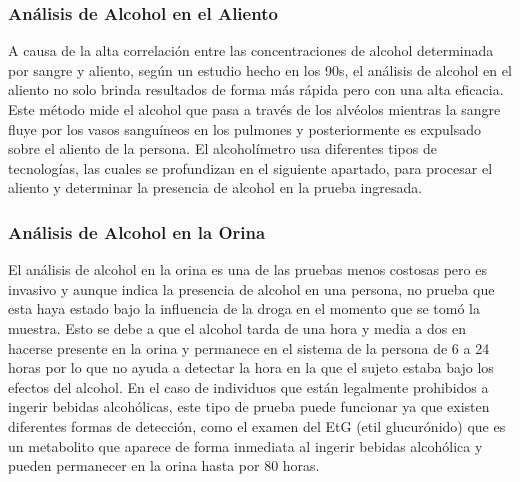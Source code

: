 \subsubsection{Análisis de Alcohol en el Aliento}
A causa de la alta correlación entre las concentraciones de alcohol determinada por sangre y aliento, según un estudio hecho en los 90s, el análisis de alcohol en el aliento no solo brinda resultados de forma más rápida pero con una alta eficacia. Este método mide el alcohol que pasa a través de los alvéolos mientras la sangre fluye por los vasos sanguíneos en los pulmones y posteriormente es expulsado sobre el aliento de la persona.  El alcoholímetro usa diferentes tipos de tecnologías, las cuales se profundizan en el siguiente apartado, para procesar el aliento y determinar la presencia de alcohol en la prueba ingresada.
\subsubsection{Análisis de Alcohol en la Orina}
El análisis de alcohol en la orina es una de las pruebas menos costosas pero es invasivo y aunque indica la presencia de alcohol en una persona, no prueba que esta haya estado bajo la influencia de la droga en el momento que se tomó la muestra. Esto se debe a que el alcohol tarda de una hora y media a dos en hacerse presente en la orina y permanece en el sistema de la persona de 6 a 24 horas por lo que no ayuda a detectar la hora en la que el sujeto estaba bajo los efectos del alcohol. En el caso de individuos que están legalmente prohibidos a ingerir bebidas alcohólicas, este tipo de prueba puede funcionar ya que existen diferentes formas de detección, como el examen del EtG (etil glucurónido) que es un metabolito que aparece de forma inmediata al ingerir bebidas alcohólica y pueden permanecer en la orina hasta por 80 horas.
